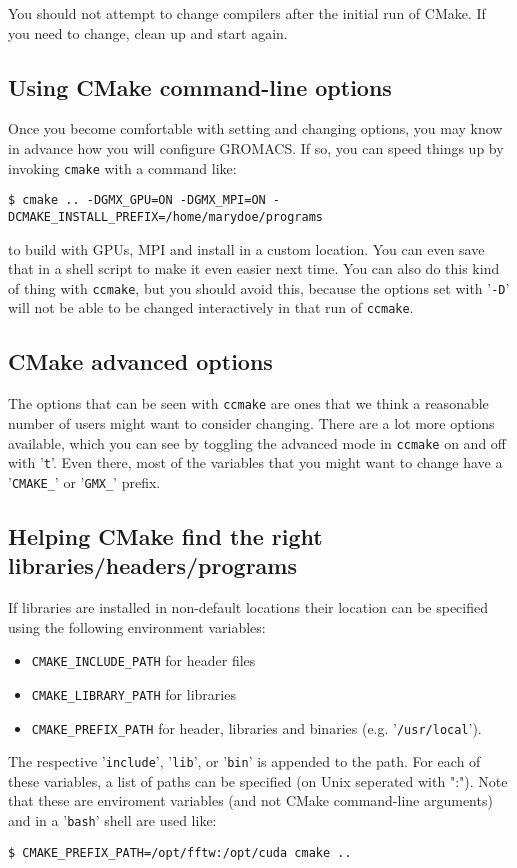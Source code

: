 \documentclass{article}[12pt,a4paper,twoside]
\newcommand{\cmake}{CMake}
\begin{document}
You should not attempt to change compilers after the initial run of
\cmake{}. If you need to change, clean up and start again.

\subsection{Using CMake command-line options}
Once you become comfortable with setting and changing options, you
may know in advance how you will configure GROMACS. If so, you can
speed things up by invoking \verb+cmake+ with a command like:
\begin{verbatim}
$ cmake .. -DGMX_GPU=ON -DGMX_MPI=ON -DCMAKE_INSTALL_PREFIX=/home/marydoe/programs
\end{verbatim}
to build with GPUs, MPI and install in a custom location. You can even
save that in a shell script to make it even easier next time. You can
also do this kind of thing with \verb+ccmake+, but you should avoid
this, because the options set with '\verb+-D+' will not be able to be
changed interactively in that run of \verb+ccmake+.

\subsection{CMake advanced options}
The options that can be seen with \verb+ccmake+ are ones that we
think a reasonable number of users might want to consider
changing. There are a lot more options available, which you can see by
toggling the advanced mode in \verb+ccmake+ on and off with
'\verb+t+'. Even there, most of the variables that you might want to
change have a '\verb+CMAKE_+' or '\verb+GMX_+' prefix.

\subsection{Helping CMake find the right libraries/headers/programs}

If libraries are installed in non-default locations their location can
be specified using the following environment variables:
\begin{itemize}
\item \verb+CMAKE_INCLUDE_PATH+ for header files
\item \verb+CMAKE_LIBRARY_PATH+ for libraries
\item \verb+CMAKE_PREFIX_PATH+ for header, libraries and binaries
  (e.g. '\verb+/usr/local+').
\end{itemize}
The respective '\verb+include+', '\verb+lib+', or '\verb+bin+' is
appended to the path. For each of these variables, a list of paths can
be specified (on Unix seperated with ":"). Note that these are
enviroment variables (and not \cmake{} command-line arguments) and in
a '\verb+bash+' shell are used like:
\begin{verbatim}
$ CMAKE_PREFIX_PATH=/opt/fftw:/opt/cuda cmake ..
\end{verbatim}
\end{document}
